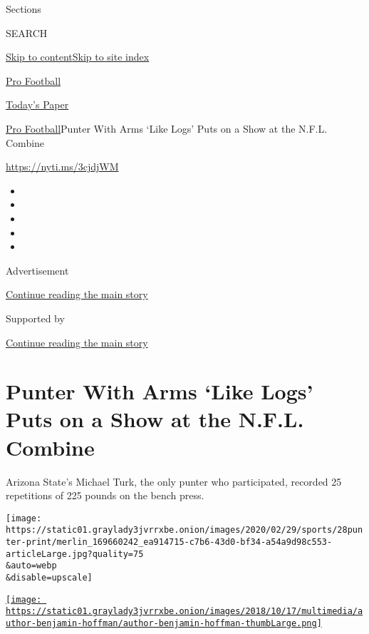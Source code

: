 Sections

SEARCH

\protect\hyperlink{site-content}{Skip to
content}\protect\hyperlink{site-index}{Skip to site index}

\href{https://www.nytimes3xbfgragh.onion/section/sports/football}{Pro
Football}

\href{https://myaccount.nytimes3xbfgragh.onion/auth/login?response_type=cookie\&client_id=vi}{}

\href{https://www.nytimes3xbfgragh.onion/section/todayspaper}{Today's
Paper}

\href{/section/sports/football}{Pro Football}\textbar{}Punter With Arms
`Like Logs' Puts on a Show at the N.F.L. Combine

\url{https://nyti.ms/3cjdjWM}

\begin{itemize}
\item
\item
\item
\item
\item
\end{itemize}

Advertisement

\protect\hyperlink{after-top}{Continue reading the main story}

Supported by

\protect\hyperlink{after-sponsor}{Continue reading the main story}

\hypertarget{punter-with-arms-like-logs-puts-on-a-show-at-the-nfl-combine}{%
\section{Punter With Arms `Like Logs' Puts on a Show at the N.F.L.
Combine}\label{punter-with-arms-like-logs-puts-on-a-show-at-the-nfl-combine}}

Arizona State's Michael Turk, the only punter who participated, recorded
25 repetitions of 225 pounds on the bench press.

\texttt{[image: https://static01.graylady3jvrrxbe.onion/images/2020/02/29/sports/28punter-print/merlin\_169660242\_ea914715-c7b6-43d0-bf34-a54a9d98c553-articleLarge.jpg?quality=75\\\&auto=webp\\\&disable=upscale]}

\href{https://www.nytimes3xbfgragh.onion/by/benjamin-hoffman}{\texttt{[image: https://static01.graylady3jvrrxbe.onion/images/2018/10/17/multimedia/author-benjamin-hoffman/author-benjamin-hoffman-thumbLarge.png]}}

